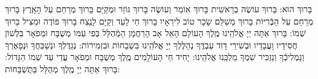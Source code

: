 \documentclass[twoside, openany, parskip=half, 11pt]{book}
\begin{document}

בָּרוּךְ הוּא:
 בָּרוּךְ עוֹשֶׂה בְרֵאשִׁית בָּרוּךְ אוֹמֵר וְעוֹשֶׂה
 בָּרוּךְ גּוֹזֵר וּמְקַיֵּם בָּרוּךְ מְרַחֵם עַל הָאָֽרֶץ
 בָּרוּךְ מְרַחֵם עַל הַבְּֿרִיּוֹת בָּרוּךְ מְשַׁלֵּם שָׂכָר טוֹב לִירֵאָיו
 בָּרוּךְ חַי לָעַד וְקַיָּם לָנֶֽצַח בָּרוּךְ פּוֹדֶה וּמַצִּיל  בָּרוּךְ שְׁמוֹ:
  בָּרוּךְ אַתָּה יְיָ אֱלֹהֵֽינוּ מֶֽלֶךְ הָעוֹלָם הָאֵל אָב הָרַחֲמָן הַמְֿהֻלָּל בְּפִי עַמּוֹ מְשֻׁבָּח וּמְפֹאָר בִּלְשׁוֹן חֲסִידָיו וַעֲבָדָיו וּבְשִׁירֵי דָוִד עַבְדֶּֽךָ נְהַלֶּלְךָ יְיָ אֱלֹהֵֽינוּ בִּשְׁבָחוֹת וּבִזְמִירוֹת: נְגַדֶּלְךָ וּנְשַׁבֵּחֲךָ וּנְפָאֶרְךָ וְנַמְלִיכְֿךָ וְנַזְכִּיר שִׁמְךָ מַלְכֵּֽנוּ אֱלֹהֵֽינוּ:
 יָחִיד חַי הָעוֹלָמִים מֶֽלֶךְ מְשֻׁבָּח וּמְפֹאָר עֲדֵי עַד שְׁמוֹ הַגָּדוֹל: בָּרוּךְ אַתָּה יְיָ מֶֽלֶךְ מְהֻלָּל בַּתֻּשְׁבָּחוֹת:
\end{document}

